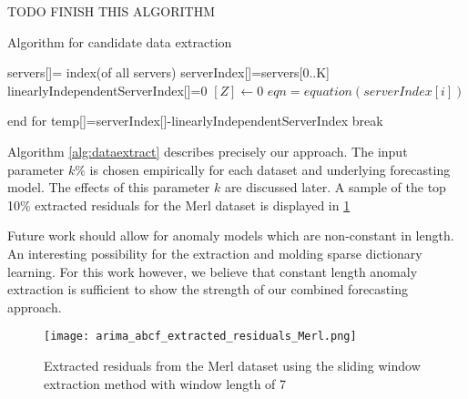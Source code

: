 TODO FINISH THIS ALGORITHM
\begin{algorithm}
  \caption{Algorithm for candidate data extraction}
    \label{alg:dataextract}

  \begin{algorithmic}
    \Statex {}
    \State servers[]= index(of all servers) 
    \State serverIndex[]=servers[0..K]
    \State linearlyIndependentServerIndex[]=0
    \State $[Z] \leftarrow 0$
    \Statex{} 
    \State        $eqn= equation(serverIndex[i])$ 
    \Statex{} 

    \EndFor end for 
    \Statex{}  
    \State temp[]=serverIndex[]-linearlyIndependentServerIndex 
    \State break
    \EndIf  
    \EndWhile  
  \end{algorithmic}
\end{algorithm}

Algorithm \ref{alg:dataextract} describes precisely our approach.  The input parameter $k\%$ is chosen empirically for each dataset and underlying forecasting model.  The effects of this parameter $k$ are discussed later.  A sample of the top 10\% extracted residuals for the Merl dataset is displayed in \ref{fig:extracted_residuals}

Future work should allow for anomaly models which are non-constant in length.  An interesting possibility for the extraction and molding sparse dictionary learning. For this work however, we believe that constant length anomaly extraction is sufficient to show the strength of our combined forecasting approach.


\begin{figure}
	\begin{center}
		\texttt{[image: arima\_abcf\_extracted\_residuals\_Merl.png]}
	\end{center}
	\caption{Extracted residuals from the Merl dataset using the sliding window extraction method with window length of 7}
	\label{fig:extracted_residuals}
\end{figure}



